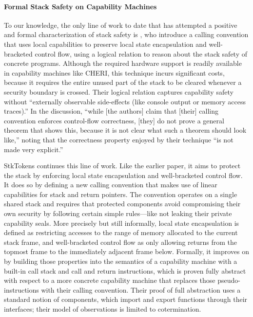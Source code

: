 \documentclass[acmsmall,review,anonymous]{acmart}\settopmatter{printfolios=true,printccs=false,printacmref=false}
\begin{document}

\paragraph{Formal Stack Safety on Capability Machines}
%
To our knowledge, the only line of work to date that has attempted
a positive and formal characterization of
stack safety is \citet{Skorstengaard+19b}, who introduce a calling
convention that uses local capabilities to preserve local state
encapsulation and well-bracketed control flow, using a logical
relation to reason about the stack safety of concrete
programs. Although the required hardware support is readily available
in capability machines like CHERI, this technique incurs significant
costs, because it requires the entire unused part of the stack to be
cleared whenever a security boundary is crossed. Their logical
relation captures capability safety without ``externally observable
side-effects (like console output or memory access traces).'' In the
discussion, ``while [the authors] claim that [their] calling
convention enforces control-flow correctness, [they] do not prove a
general theorem that shows this, because it is not clear what such a
theorem should look like,'' noting that the correctness property
enjoyed by their technique ``is not made very explicit.''

StkTokens \citep{Skorstengaard+19} continues this line of work. Like
the earlier paper, it aims to protect the stack by enforcing local state
encapsulation and well-bracketed control flow. It does so by defining a new
calling convention that makes use of linear capabilities for stack and return
pointers. The convention operates on a single shared stack and requires that
protected components avoid compromising their own security by following certain
simple rules---like not leaking their private capability seals. More
precisely but still informally, local state encapsulation is defined as
restricting accesses to the range of memory allocated to the current stack
frame, and well-bracketed control flow as only allowing returns from the topmost
frame to the immediately adjacent frame below. Formally, it improves on
\citet{Skorstengaard+19b} by building those properties into the semantics of a
capability machine with a built-in call stack and call and return instructions,
which is proven fully abstract with respect to a more concrete capability
machine that replaces those pseudo-instructions with their calling convention.
Their proof of full abstraction uses a standard notion of components, which
import and export functions through their interfaces; their model of
observations is limited to cotermination.
\end{document}
